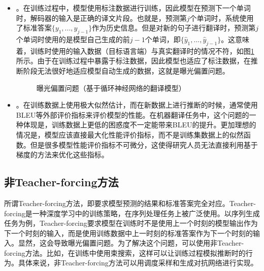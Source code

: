 \begin{itemize}
\vspace{0.5em}
\item {\small{}}。在训练过程中，模型使用标注数据进行训练，因此模型在预测下一个单词时，解码器的输入是正确的译文片段。也就是，预测第$j$个单词时，系统使用了标准答案$\{{y}_1,...,{y}_{j-1}\}$作为历史信息。但是对新的句子进行翻译时，预测第$j$个单词时使用的是模型自己生成的前$j-1$个单词，即$\{\hat{{y}}_1,...,\hat{{y}}_{j-1}\}$。这意味着，训练时使用的输入数据（目标语言端）与真实翻译时的情况不符，如图\ref{fig:13-8}所示。由于在训练过程中暴露于标注数据，因此模型也适应了标注数据，在推断阶段无法很好地适应模型自动生成的数据，这就是曝光偏置问题。
\vspace{0.5em}

\begin{figure}[t]
\centering

\caption{曝光偏置问题（基于循环神经网络的翻译模型）}
\label{fig:13-8}
\end{figure}

\item {\small{}}。在训练数据上使用极大似然估计，而在新数据上进行推断的时候，通常使用BLEU等外部评价指标来评价模型的性能。在机器翻译任务中，这个问题的一种体现是，训练数据上更低的困惑度不一定能带来BLEU的提升。更加理想的情况是，模型应该直接最大化性能评价指标，而不是训练集数据上的似然函数。但是很多模型性能评价指标不可微分，这使得研究人员无法直接利用基于梯度的方法来优化这些指标。
\vspace{0.5em}
\end{itemize}


\subsection{非Teacher-forcing方法}

\parinterval 所谓Teacher-forcing方法，即要求模型预测的结果和标准答案完全对应。Teacher-forcing是一种深度学习中的训练策略，在序列处理任务上被广泛使用。以序列生成任务为例，Teacher-forcing要求模型在训练时不是使用上一个时刻的模型输出作为下一个时刻的输入，而是使用训练数据中上一时刻的标准答案作为下一个时刻的输入。显然，这会导致曝光偏置问题。为了解决这个问题，可以使用非Teacher-forcing方法。比如，在训练中使用束搜索，这样可以让训练过程模拟推断时的行为。具体来说，非Teacher-forcing方法可以用调度采样和生成对抗网络进行实现。

